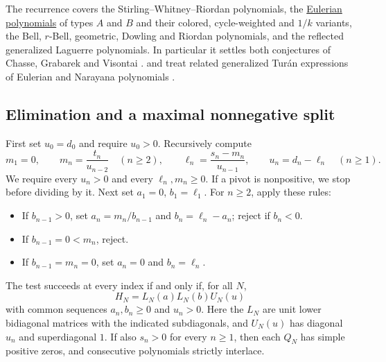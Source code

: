 The recurrence covers the Stirling--Whitney--Riordan polynomials, the
\hyperref[eulerianPolynomial]{Eulerian polynomials} of types $A$ and $B$ and
their colored, cycle-weighted and $1/k$ variants, the Bell, $r$-Bell,
geometric, Dowling and Riordan polynomials, and the reflected generalized
Laguerre polynomials.  In particular it settles both conjectures of Chasse,
Grabarek and Visontai \cite[Thms.~1.2--1.3]{Shi2026x}.   and
 treat related generalized Turán expressions of Eulerian and
Narayana polynomials \cite{GaoLiu2026x}.

\subsection[interlacingFourTermSplit]{Elimination and a maximal nonnegative split}

First set $u_0=d_0$ and require $u_0>0$. Recursively compute
\[
 m_1=0,\qquad m_n=\frac{t_n}{u_{n-2}}\quad(n\geq2),\qquad
 \ell_n=\frac{s_n-m_n}{u_{n-1}},\qquad u_n=d_n-\ell_n\quad(n\geq1).
\]
We require every $u_n>0$ and every $\ell_n,m_n\geq0$.
If a pivot is nonpositive, we stop before dividing by it.
Next set $a_1=0$, $b_1=\ell_1$. For $n\geq2$, apply these rules:
\begin{itemize}
\item If $b_{n-1}>0$, set $a_n=m_n/b_{n-1}$ and $b_n=\ell_n-a_n$;
reject if $b_n<0$.
\item If $b_{n-1}=0<m_n$, reject.
\item If $b_{n-1}=m_n=0$, set $a_n=0$ and $b_n=\ell_n$.
\end{itemize}

\begin{theorem}
The test succeeds at every index if and only if, for all $N$,
\[
 H_N=L_N(a)L_N(b)U_N(u)
\]
with common sequences $a_n,b_n\geq0$ and $u_n>0$.
Here the $L_N$ are unit lower bidiagonal matrices with the indicated
subdiagonals, and $U_N(u)$ has diagonal $u_n$ and superdiagonal $1$.
If also $s_n>0$ for every $n\geq1$, then each $Q_N$ has simple positive
zeros, and consecutive polynomials strictly interlace.
\end{theorem}

